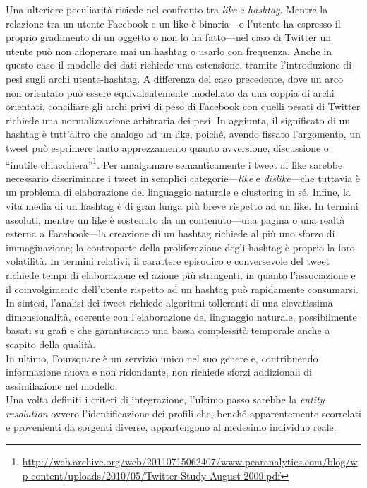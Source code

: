 Una ulteriore peculiarit\`a risiede nel confronto tra \textit{like} e \textit{hashtag}. Mentre la relazione tra un utente Facebook e un like \`e binaria---o l'utente ha espresso il proprio gradimento di un oggetto o non lo ha fatto---nel caso di Twitter un utente pu\`o non adoperare mai un hashtag o usarlo con frequenza. Anche in questo caso il modello dei dati richiede una estensione, tramite l'introduzione di pesi sugli archi utente-hashtag. A differenza del caso precedente, dove un arco non orientato pu\`o essere equivalentemente modellato da una coppia di archi orientati, conciliare gli archi privi di peso di Facebook con quelli pesati di Twitter richiede una normalizzazione arbitraria dei pesi. In aggiunta, il significato di un hashtag \`e tutt'altro che analogo ad un like, poich\'e, avendo fissato l'argomento, un tweet pu\`o esprimere tanto apprezzamento quanto avversione, discussione o ``inutile chiacchiera''\footnote{\url{http://web.archive.org/web/20110715062407/www.pearanalytics.com/blog/wp-content/uploads/2010/05/Twitter-Study-August-2009.pdf}}. Per amalgamare semanticamente i tweet ai like sarebbe necessario discriminare i tweet in semplici categorie---\textit{like} e \textit{dislike}---che tuttavia \`e un problema di elaborazione del linguaggio naturale e clustering in s\'e. Infine, la vita media di un hashtag \`e di gran lunga pi\`u breve rispetto ad un like. In termini assoluti, mentre un like \`e sostenuto da un contenuto---una pagina o una realt\`a esterna a Facebook---la creazione di un hashtag richiede al pi\`u uno sforzo di immaginazione; la controparte della proliferazione degli hashtag \`e proprio la loro volatilit\`a. In termini relativi, il carattere episodico e conversevole del tweet richiede tempi di elaborazione ed azione pi\`u stringenti, in quanto l'associazione e il coinvolgimento dell'utente rispetto ad un hashtag pu\`o rapidamente consumarsi. In sintesi, l'analisi dei tweet richiede algoritmi tolleranti di una elevatissima dimensionalit\`a, coerente con l'elaborazione del linguaggio naturale, possibilmente basati su grafi e che garantiscano una bassa complessit\`a temporale anche a scapito della qualit\`a.\\
In ultimo, Foursquare \`e un servizio unico nel suo genere e, contribuendo informazione nuova e non ridondante, non richiede sforzi addizionali di assimilazione nel modello.\\
Una volta definiti i criteri di integrazione, l'ultimo passo sarebbe la \textit{entity resolution} ovvero l'identificazione dei profili che, bench\'e apparentemente scorrelati e provenienti da sorgenti diverse, appartengono al medesimo individuo reale.\\
